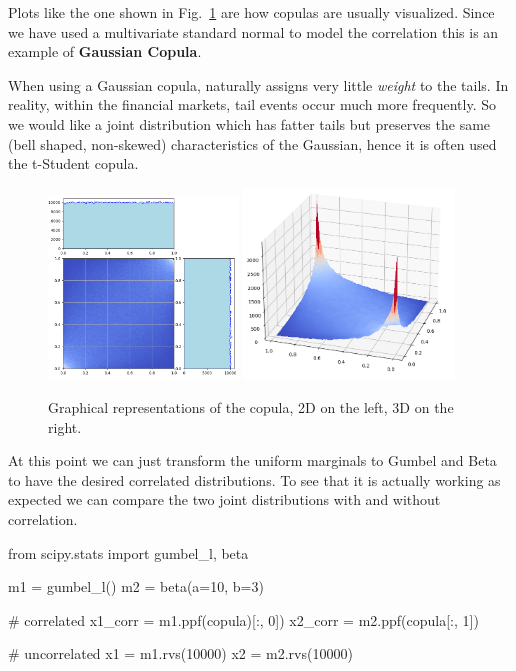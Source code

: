 Plots like the one shown in Fig.~\ref{fig:copula} are how copulas are usually visualized. Since we have used a multivariate standard normal to model the correlation this is an example of \textbf{Gaussian Copula}.

When using a Gaussian copula, naturally assigns very little \emph{weight} to the tails. In reality, within the financial markets, tail events occur much more
frequently. So we would like a joint distribution which has fatter tails but preserves the same (bell
shaped, non-skewed) characteristics of the Gaussian, hence it is often used the t-Student copula.

\begin{figure}[htbp]
\centering
\includegraphics[width=0.45\textwidth]{figures/copula_2d}
\quad
\includegraphics[width=0.5\textwidth]{figures/copula_3d}
\caption{Graphical representations of the copula, 2D on the left, 3D on the right.}
\label{fig:copula}
\end{figure}

At this point we can just transform the uniform marginals to Gumbel and Beta to have the desired correlated distributions.
To see that it is actually working as expected we can compare the two joint distributions with and without correlation.

\begin{ipython}
from scipy.stats import gumbel_l, beta

m1 = gumbel_l()
m2 = beta(a=10, b=3)

# correlated 
x1_corr = m1.ppf(copula)[:, 0])
x2_corr = m2.ppf(copula[:, 1])

# uncorrelated
x1 = m1.rvs(10000)
x2 = m2.rvs(10000)
\end{ipython}

